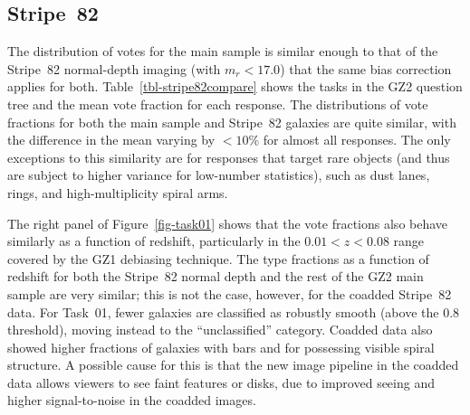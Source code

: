 \documentclass[useAMS,usenatbib]{mn2e}
\begin{document}


\subsection{Stripe~82}\label{ssec-s82}

The distribution of votes for the main sample is similar enough to that of the Stripe~82 normal-depth imaging (with $m_r<17.0$) that the same bias correction applies for both. Table~\ref{tbl-stripe82compare} shows the tasks in the GZ2 question tree and the mean vote fraction for each response. The distributions of vote fractions for both the main sample and Stripe~82 galaxies are quite similar, with the difference in the mean varying by $<10\%$ for almost all responses. The only exceptions to this similarity are for responses that target rare objects (and thus are subject to higher variance for low-number statistics), such as dust lanes, rings, and high-multiplicity spiral arms. 

The right panel of Figure~\ref{fig-task01} shows that the vote fractions also behave similarly as a function of redshift, particularly in the $0.01<z<0.08$ range covered by the GZ1 debiasing technique. The type fractions as a function of redshift for both the Stripe~82 normal depth and the rest of the GZ2 main sample are very similar; this is not the case, however, for the coadded Stripe~82 data. For Task~01, fewer galaxies are classified as robustly smooth (above the 0.8 threshold), moving instead to the ``unclassified'' category. Coadded data also showed higher fractions of galaxies with bars and for possessing visible spiral structure. A possible cause for this is that the new image pipeline in the coadded data allows viewers to see faint features or disks, due to improved seeing \citep[from $1.4\arcsec$ to $1.1\arcsec$;][]{ann11} and higher signal-to-noise in the coadded images.
\end{document}

